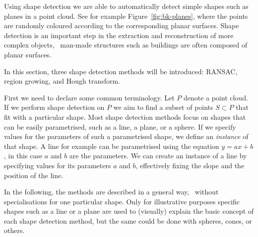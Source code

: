 Using shape detection we are able to automatically detect simple shapes such as planes in a point cloud.
See for example Figure~\ref{fig:bk-planes}, where the points are randomly coloured according to the corresponding planar surfaces.
Shape detection is an important step in the extraction and reconstruction of more complex objects, \eg\ man-made structures such as buildings are often composed of planar surfaces.

In this section, three shape detection methods will be introduced: RANSAC, region growing, and Hough transform.


First we need to declare some common terminology.
Let $P$ denote a point cloud. 
If we perform shape detection on $P$ we aim to find a subset of points $S \subset P$ that fit with a particular shape. 
Most shape detection methods focus on shapes that can be easily parametrised, such as a line, a plane, or a sphere. 
If we specify values for the parameters of such a parametrised shape, we define an \emph{instance} of that shape.
A line for example can be parametrised using the equation $y = ax + b$, in this case $a$ and $b$ are the parameters.
We can create an instance of a line by specifying values for its parameters $a$ and $b$, effectively fixing the slope and the position of the line.

In the following, the methods are described in a general way, \ie\ without specialisations for one particular shape.
Only for illustrative purposes specific shapes such as a line or a plane are used to (visually) explain the basic concept of each shape detection method, but the same could be done with spheres, cones, or others.




